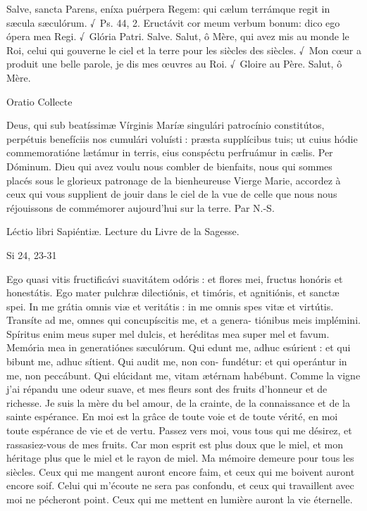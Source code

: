 \begin{paracol}{2}
Salve, sancta Parens, eníxa puérpera Regem: qui cælum terrámque regit in sæcula sæculórum. √~Ps. 44, 2. Eructávit cor meum verbum bonum: dico ego ópera mea Regi. √~Glória Patri. Salve.
\switchcolumn
Salut, ô Mère, qui avez mis au monde le Roi, celui qui gouverne le ciel et la terre pour les siècles des siècles. √~Mon cœur a produit une belle parole, je dis mes œuvres au Roi. √~Gloire au Père. Salut, ô Mère.
\switchcolumn*

Oratio
\switchcolumn
Collecte
\switchcolumn*

Deus, qui sub beatíssimæ Vírginis Maríæ singulári patrocínio constitútos, perpétuis benefíciis nos cumulári voluísti : præsta supplícibus tuis; ut cuius hódie commemoratióne lætámur in terris, eius conspéctu perfruámur in cælis. Per Dóminum.
\switchcolumn
Dieu qui avez voulu nous combler de bienfaits, nous qui sommes placés sous le glorieux patronage de la bienheureuse Vierge Marie, accordez à ceux qui vous supplient de jouir dans le ciel de la vue de celle que nous nous réjouissons de commémorer aujourd’hui sur la terre. Par N.-S.
\switchcolumn*

Léctio libri Sapiéntiæ.
\switchcolumn
Lecture du Livre de la Sagesse.
\switchcolumn*

Si 24, 23-31
\switchcolumn

\switchcolumn*

Ego quasi vitis fructificávi suavitátem odóris : et flores mei, fructus honóris et honestátis. Ego mater pulchræ dilectiónis, et timóris, et agnitiónis, et sanctæ spei. In me grátia omnis viæ et veritátis : in me omnis spes vitæ et virtútis. Transíte ad me, omnes qui concupíscitis me, et a genera- tiónibus meis implémini. Spíritus enim meus super mel dulcis, et heréditas mea super mel et favum. Memória mea in generatiónes sæculórum. Qui edunt me, adhuc esúrient : et qui bibunt me, adhuc sítient. Qui audit me, non con- fundétur: et qui operántur in me, non peccábunt. Qui elúcidant me, vitam ætérnam habébunt.
\switchcolumn
Comme la vigne j’ai répandu une odeur suave, et mes fleurs sont des fruits d’honneur et de richesse. Je suis la mère du bel amour, de la crainte, de la connaissance et de la sainte espérance. En moi est la grâce de toute voie et de toute vérité, en moi toute espérance de vie et de vertu. Passez vers moi, vous tous qui me désirez, et rassasiez-vous de mes fruits. Car mon esprit est plus doux que le miel, et mon héritage plus que le miel et le rayon de miel. Ma mémoire demeure pour tous les siècles. Ceux qui me mangent auront encore faim, et ceux qui me boivent auront encore soif. Celui qui m’écoute ne sera pas confondu, et ceux qui travaillent avec moi ne pécheront point. Ceux qui me mettent en lumière auront la vie éternelle.
\switchcolumn*


\end{paracol}
